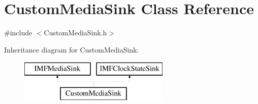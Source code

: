 \hypertarget{class_custom_media_sink}{}\section{Custom\+Media\+Sink Class Reference}
\label{class_custom_media_sink}


{\ttfamily \#include $<$Custom\+Media\+Sink.\+h$>$}

Inheritance diagram for Custom\+Media\+Sink\+:\begin{figure}[H]
\begin{center}
\leavevmode
\includegraphics[height=2.000000cm]{da/d96/class_custom_media_sink}
\end{center}
\end{figure}
